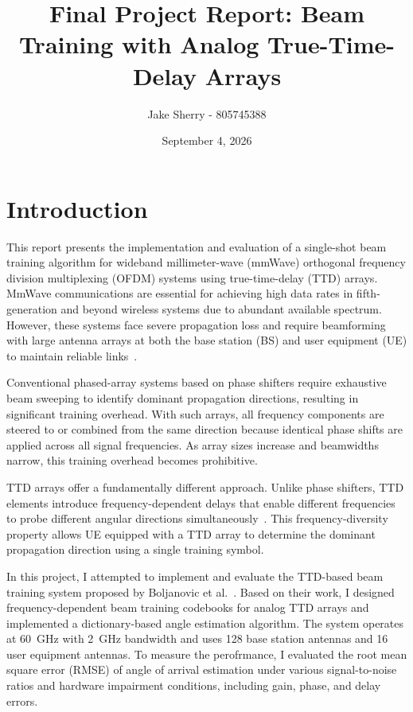 \documentclass[12pt,letterpaper]{article}
\title{\textbf{Final Project Report: Beam Training with Analog True-Time-Delay Arrays}}
\author{Jake Sherry - 805745388}
\date{September 4, 2026}
\begin{document}
\maketitle

\section{Introduction}

This report presents the implementation and evaluation of a single-shot beam training algorithm for wideband millimeter-wave (mmWave) orthogonal frequency division multiplexing (OFDM) systems using true-time-delay (TTD) arrays. MmWave communications are essential for achieving high data rates in fifth-generation and beyond wireless systems due to abundant available spectrum. However, these systems face severe propagation loss and require beamforming with large antenna arrays at both the base station (BS) and user equipment (UE) to maintain reliable links~\cite{boljanovic2020design}.

Conventional phased-array systems based on phase shifters require exhaustive beam sweeping to identify dominant propagation directions, resulting in significant training overhead. With such arrays, all frequency components are steered to or combined from the same direction because identical phase shifts are applied across all signal frequencies. As array sizes increase and beamwidths narrow, this training overhead becomes prohibitive.

TTD arrays offer a fundamentally different approach. Unlike phase shifters, TTD elements introduce frequency-dependent delays that enable different frequencies to probe different angular directions simultaneously~\cite{boljanovic2020design}. This frequency-diversity property allows UE equipped with a TTD array to determine the dominant propagation direction using a single training symbol.

In this project, I attempted to implement and evaluate the TTD-based beam training system proposed by Boljanovic et al.~\cite{boljanovic2020design}. Based on their work, I designed frequency-dependent beam training codebooks for analog TTD arrays and implemented a dictionary-based angle estimation algorithm. The system operates at 60~GHz with 2~GHz bandwidth and uses 128 base station antennas and 16 user equipment antennas. To measure the perofrmance, I evaluated the root mean square error (RMSE) of angle of arrival estimation under various signal-to-noise ratios and hardware impairment conditions, including gain, phase, and delay errors.
\end{document}
